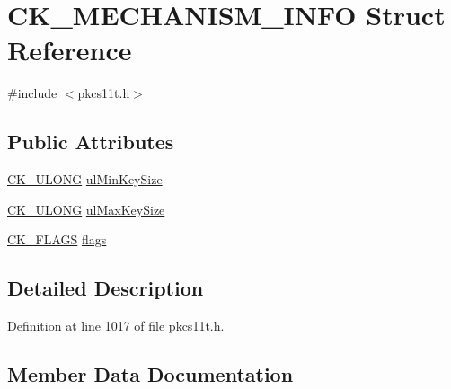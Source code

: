 \hypertarget{struct_c_k___m_e_c_h_a_n_i_s_m___i_n_f_o}{}\section{C\+K\+\_\+\+M\+E\+C\+H\+A\+N\+I\+S\+M\+\_\+\+I\+N\+FO Struct Reference}
\label{struct_c_k___m_e_c_h_a_n_i_s_m___i_n_f_o}


{\ttfamily \#include $<$pkcs11t.\+h$>$}

\subsection*{Public Attributes}
\begin{DoxyCompactItemize}
\item 
\hyperlink{pkcs11t_8h_a35181858a3b7a0a81f49d180d8f446ef}{C\+K\+\_\+\+U\+L\+O\+NG} \hyperlink{struct_c_k___m_e_c_h_a_n_i_s_m___i_n_f_o_a4cfb88703adbce245090f1761cf155c3}{ul\+Min\+Key\+Size}
\item 
\hyperlink{pkcs11t_8h_a35181858a3b7a0a81f49d180d8f446ef}{C\+K\+\_\+\+U\+L\+O\+NG} \hyperlink{struct_c_k___m_e_c_h_a_n_i_s_m___i_n_f_o_ab5833180294f1a83f91a5ed8ccda92d6}{ul\+Max\+Key\+Size}
\item 
\hyperlink{pkcs11t_8h_a53850492c1ba57aca4332be791a3c6a3}{C\+K\+\_\+\+F\+L\+A\+GS} \hyperlink{struct_c_k___m_e_c_h_a_n_i_s_m___i_n_f_o_ad40ae095abd3c1512a5fc08ea208783a}{flags}
\end{DoxyCompactItemize}


\subsection{Detailed Description}


Definition at line 1017 of file pkcs11t.\+h.



\subsection{Member Data Documentation}
\mbox{\label{struct_c_k___m_e_c_h_a_n_i_s_m___i_n_f_o_ad40ae095abd3c1512a5fc08ea208783a}} 
